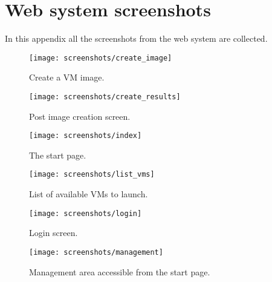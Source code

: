 \chapter{Web system screenshots} \label{chap:ap6}

In this appendix all the screenshots from the web system are collected.

\begin{figure}[h]
  \begin{center}
    \leavevmode
    \texttt{[image: screenshots/create\_image]}
    \caption{Create a VM image.}
    \label{fig:vm-creation}
  \end{center}
\end{figure}

\begin{figure}[h]
  \begin{center}
    \leavevmode
    \texttt{[image: screenshots/create\_results]}
    \caption{Post image creation screen.}
    \label{fig:create-results}
  \end{center}
\end{figure}


\begin{figure}[h]
  \begin{center}
    \leavevmode
    \texttt{[image: screenshots/index]}
    \caption{The start page.}
    \label{fig:index}
  \end{center}
\end{figure}

\begin{figure}[h]
  \begin{center}
    \leavevmode
    \texttt{[image: screenshots/list\_vms]}
    \caption{List of available VMs to launch.}
    \label{fig:available-vms}
  \end{center}
\end{figure}

\begin{figure}[h]
  \begin{center}
    \leavevmode
    \texttt{[image: screenshots/login]}
    \caption{Login screen.}
    \label{fig:login}
  \end{center}
\end{figure}

\begin{figure}[h]
  \begin{center}
    \leavevmode
    \texttt{[image: screenshots/management]}
    \caption{Management area accessible from the start page.}
    \label{fig:management}
  \end{center}
\end{figure}

